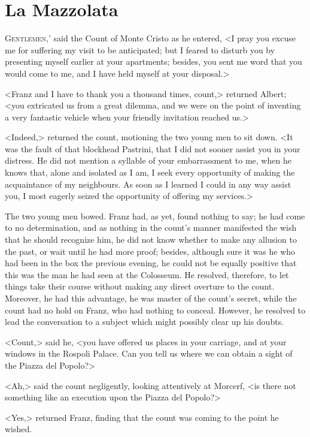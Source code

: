 \chapter{La Mazzolata} 

 \lettrine[ante=`]{G}{entlemen},' said the Count of Monte Cristo as he entered, <I pray you excuse me for suffering my visit to be anticipated; but I feared to disturb you by presenting myself earlier at your apartments; besides, you sent me word that you would come to me, and I have held myself at your disposal.> 

 <Franz and I have to thank you a thousand times, count,> returned Albert; <you extricated us from a great dilemma, and we were on the point of inventing a very fantastic vehicle when your friendly invitation reached us.> 

 <Indeed,> returned the count, motioning the two young men to sit down. <It was the fault of that blockhead Pastrini, that I did not sooner assist you in your distress. He did not mention a syllable of your embarrassment to me, when he knows that, alone and isolated as I am, I seek every opportunity of making the acquaintance of my neighbours. As soon as I learned I could in any way assist you, I most eagerly seized the opportunity of offering my services.> 

 The two young men bowed. Franz had, as yet, found nothing to say; he had come to no determination, and as nothing in the count's manner manifested the wish that he should recognize him, he did not know whether to make any allusion to the past, or wait until he had more proof; besides, although sure it was he who had been in the box the previous evening, he could not be equally positive that this was the man he had seen at the Colosseum. He resolved, therefore, to let things take their course without making any direct overture to the count. Moreover, he had this advantage, he was master of the count's secret, while the count had no hold on Franz, who had nothing to conceal. However, he resolved to lead the conversation to a subject which might possibly clear up his doubts. 

 <Count,> said he, <you have offered us places in your carriage, and at your windows in the Rospoli Palace. Can you tell us where we can obtain a sight of the Piazza del Popolo?> 

 <Ah,> said the count negligently, looking attentively at Morcerf, <is there not something like an execution upon the Piazza del Popolo?> 

 <Yes,> returned Franz, finding that the count was coming to the point he wished. 

